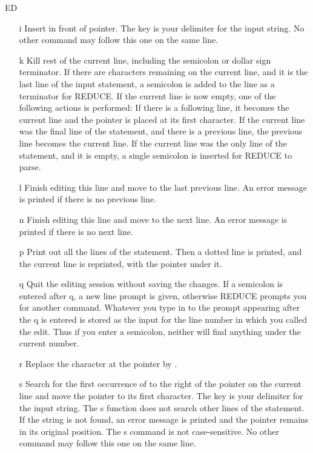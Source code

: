 \begin{Command}{ED}
\begin{itemize}
\item[i\meta{string}\key{ESC}]
Insert  in front of pointer.  The  key is your
delimiter for the input string.  No other command may follow this one on
the same line.

\item[k]
Kill rest of the current line, including the semicolon or dollar sign
terminator.  If there are characters remaining on the current line, and it
is the last line of the input statement, a semicolon is added to the line
as a terminator for REDUCE.  If the current line is now empty, one of the
following actions is performed:  If there is a following line, it becomes
the current line and the pointer is placed at its first character.  If the
current line was the final line of the statement, and there is a previous
line, the previous line becomes the current line.  If the current line was
the only line of the statement, and it is empty, a single semicolon is
inserted for REDUCE to parse.

\item[l]
Finish editing this line and move to the last previous line.  An error message
is printed if there is no previous line.

\item[n]
Finish editing this line and move to the next line.  An error message is 
printed if there is no next line.

\item[p]
Print out all the lines of the statement.  Then a dotted line is printed, and
the current line is reprinted, with the pointer under it.

\item[q]
Quit the editing session without saving the changes.  If a semicolon is
entered after q, a new line prompt is given, otherwise REDUCE prompts you
for another command.  Whatever you type in to the prompt appearing after
the q is entered is stored as the input for the line number in which you
called the edit.  Thus if you enter a semicolon, neither 
 will find anything under the current number.

\item[r\meta{char}]
Replace the character at the pointer by .

\item[s\meta{string}\key{ESC}]
Search for the first occurrence of  to the right of the
pointer on the current line and move the pointer to its first character.
The  key is your delimiter for the input string.  The s function
does not search other lines of the statement.  If the string is not found,
an error message is printed and the pointer remains in its original
position.  The s command is not case-sensitive.  No other command may
follow this one on the same line.


\end{itemize}
\end{Command}

